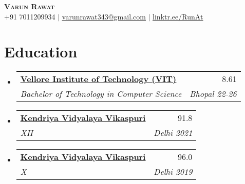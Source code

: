 \documentclass[letterpaper,11pt]{article}
\makeatletter
\newcommand{\resumeSubheading}[4]{
  \vspace{-2pt}\item
    \begin{tabular*}{0.97\textwidth}[t]{l@{\extracolsep{\fill}}r}
      \textbf{#1} & #2 \\
      \textit{\small#3} & \textit{\small #4} \\
    \end{tabular*}\vspace{-7pt}
}
\newcommand{\resumeSubHeadingListStart}{\begin{itemize}[leftmargin=0.15in, label={}]}
\newcommand{\resumeSubHeadingListEnd}{\end{itemize}}
\makeatother
\begin{document}

\begin{center}
    \textbf{\Huge \scshape Varun Rawat} \\ \vspace{1pt}
    \small +91 7011209934 $|$ \href{mailto:x@x.com}{\underline{varunrawat343@gmail.com}} $|$
    \href{https://linktr.ee/RunAt}{\underline{linktr.ee/RunAt}} %
\end{center}


\section{Education}
  \resumeSubHeadingListStart
    \resumeSubheading
     {\href{https://docs.google.com/spreadsheets/d/19a68PIKOImr63zxaMRBh5_TT5QhfCflCdVP_iLUBAFA/edit?usp=sharing}{\underline{Vellore Institute of Technology (VIT)}}}{8.61}
      {Bachelor of Technology in Computer Science}{Bhopal 22-26} 
    \resumeSubheading
      {\href{https://drive.google.com/file/d/1LhjRN9nKZUrEI_x_dg5Rs11GOEKDgBPe/view?usp=sharing}{\underline{Kendriya Vidyalaya Vikaspuri}}}{91.8}
      {XII}{Delhi 2021}
    \resumeSubheading
      {\href{https://drive.google.com/file/d/1LvgllHb9-usPZJz8zXVWFP2KLiAmjP0g/view?usp=sharing}{\underline{Kendriya Vidyalaya Vikaspuri}}}{96.0}
      {X}{Delhi 2019}
  \resumeSubHeadingListEnd

\end{document}
